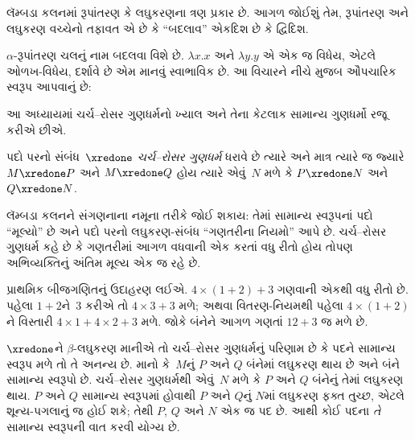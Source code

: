 \label{guunit:OLP-0651}


લૅમ્બડા કલનમાં રૂપાંતરણ કે લઘુકરણના ત્રણ
પ્રકાર છે. આગળ જોઈશું તેમ, રૂપાંતરણ અને
લઘુકરણ વચ્ચેનો તફાવત એ છે કે
``બદલાવ'' એકદિશ છે કે દ્વિદિશ.

$\alpha$-રૂપાંતરણ ચલનું નામ બદલવા વિશે છે.
$\lambda x. x$ અને $\lambda y.y$ એ એક
જ વિધેય, એટલે ઓળખ-વિધેય, દર્શાવે છે એમ
માનવું સ્વાભાવિક છે. આ વિચારને નીચે મુજબ
ઔપચારિક સ્વરૂપ આપવાનું છે:
\endgroup
\endgroup


\begingroup
\makeatletter{}\makeatother

\label{guunit:OLP-0367}


\begingroup
\makeatletter{}\makeatother


\label{guunit:OLP-0368}


આ અધ્યાયમાં ચર્ચ--રોસર ગુણધર્મનો ખ્યાલ અને તેના
કેટલાક સામાન્ય ગુણધર્મો રજૂ કરીએ છીએ.

\begin{defn}[ચર્ચ--રોસર ગુણધર્મ, CR]
  પદો પરનો સંબંધ~$\xredone$ \emph{ચર્ચ--રોસર ગુણધર્મ}
  ધરાવે છે ત્યારે અને માત્ર ત્યારે જ જ્યારે
  $M \xredone P$ અને $M \xredone Q$ હોય ત્યારે
  એવું~$N$ મળે કે $P \xredone N$ અને
  $Q \xredone N$.
\end{defn}

લૅમ્બડા કલનને સંગણનાના નમૂના તરીકે જોઈ શકાય: તેમાં
સામાન્ય સ્વરૂપનાં પદો ``મૂલ્યો'' છે અને પદો પરનો
લઘુકરણ-સંબંધ ``ગણતરીના નિયમો'' આપે છે. ચર્ચ--રોસર
ગુણધર્મ કહે છે કે ગણતરીમાં આગળ વધવાની એક કરતાં વધુ
રીતો હોય તોપણ અભિવ્યક્તિનું અંતિમ મૂલ્ય એક જ રહે છે.

પ્રાથમિક બીજગણિતનું ઉદાહરણ લઈએ. $4 \times (1+2) + 3$
ગણવાની એકથી વધુ રીતો છે. પહેલા $1+2$ને~$3$ કરીએ તો
$4 \times 3+3$ મળે; અથવા વિતરણ-નિયમથી પહેલા
$4 \times (1+2)$ને વિસ્તારી $4 \times 1+4
\times 2+3$ મળે. જોકે બંનેને આગળ ગણતાં $12+3$ જ
મળે છે.

$\xredone$ને $\beta$-લઘુકરણ માનીએ તો ચર્ચ--રોસર
ગુણધર્મનું પરિણામ છે કે પદને સામાન્ય સ્વરૂપ મળે તો તે
અનન્ય છે. માનો કે~$M$નું $P$ અને $Q$ બંનેમાં લઘુકરણ
થાય છે અને બંને સામાન્ય સ્વરૂપો છે. ચર્ચ--રોસર
ગુણધર્મથી એવું~$N$ મળે કે $P$ અને $Q$ બંનેનું
તેમાં લઘુકરણ થાય. $P$ અને $Q$ સામાન્ય સ્વરૂપમાં
હોવાથી $P$ અને $Q$નું $N$માં લઘુકરણ ફક્ત તુચ્છ,
એટલે શૂન્ય-પગલાનું જ
હોઈ શકે; તેથી $P$, $Q$ અને $N$ એક જ પદ છે. આથી
કોઈ પદના \emph{તે} સામાન્ય સ્વરૂપની વાત કરવી યોગ્ય છે.

